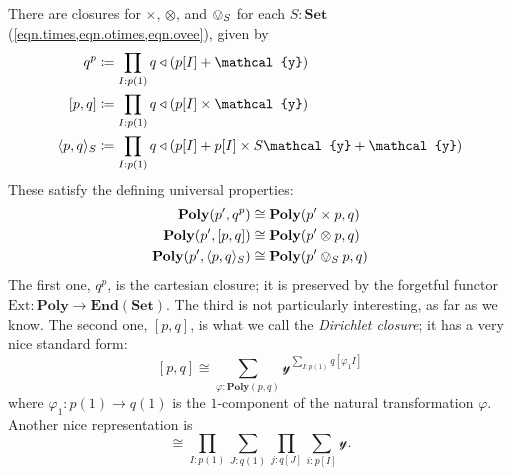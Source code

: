 \documentclass[11pt, one side, article]{memoir}
\theoremstyle{definition}
\theoremstyle{plain}
\DeclarePairedDelimiter{\present}{\langle}{\rangle}
\newcommand{\Cat}[1]{\mathbf{#1}}%
\newcommand{\fun}[1]{\mathrm{#1}}%
\newcommand{\smset}{\Cat{Set}}
\newcommand{\End}{\Cat{End}}
\newcommand{\yon}{{\mathcal{y}}}
\newcommand{\poly}{\Cat{Poly}}
\newcommand{\0}{\textsf{0}}
\newcommand{\1}{\tn{\textsf{1}}}
\newcommand{\tri}{\mathbin{\triangleleft}}
\newcommand{\ext}{\fun{Ext}}
\begin{document}
There are closures for $\times$, $\otimes$, and $\ovee_S$ for each $S:\smset$ (\cref{eqn.times,eqn.otimes,eqn.ovee}),%
given by
\begin{align}
  q^p&\coloneqq \prod_{I: p(1)}q\tri(p[I]+\yon)\label{eqn.cart_cl}\\
  [p,q]&\coloneqq\prod_{I: p(1)}q\tri(p[I]\times\yon)\\
  \present{p,q}_S&\coloneqq\prod_{I: p(1)}q\tri(p[I]+p[I]\times S\yon+\yon)
\end{align}
These satisfy the defining universal properties:
\begin{align}
  \poly(p',q^p)&\cong\poly(p'\times p,q)\\
  \poly(p',[p,q])&\cong\poly(p'\otimes p,q)\\
  \poly(p',\present{p,q}_S)&\cong\poly(p'\ovee_S p,q)
\end{align}
The first one, $q^p$, is the cartesian closure; it is preserved by the forgetful functor $\ext\colon\poly\to\End(\smset)$. The third is not particularly interesting, as far as we know. The second one, $[p,q]$, is what we call the \emph{Dirichlet closure}; it has a very nice standard form:
\begin{equation}\label{eqn.dirichlet_hom_standard}
[p,q]\cong\sum_{\varphi:\poly(p,q)}\yon^{\sum\limits_{I: p(1)}q[\varphi_1I]}
\end{equation}
where $\varphi_1\colon p(1)\to q(1)$ is the $1$-component of the natural transformation $\varphi$. Another nice representation is
\begin{equation}
[p,q]\cong\prod_{I: p(1)}\sum_{J: q(1)}\prod_{j: q[J]}\sum_{i: p[I]}\yon.
\end{equation}
\end{document}
